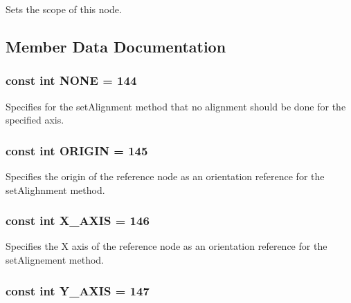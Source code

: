 Sets the scope of this node. 

\subsection{Member Data Documentation}
\hypertarget{classm3g_1_1Node_7b20f1b443e093d5ec5e990e73b47232}{
\subsubsection[{NONE}]{\setlength{\rightskip}{0pt plus 5cm}const int {\bf NONE} = 144}}
\label{classm3g_1_1Node_7b20f1b443e093d5ec5e990e73b47232}


Specifies for the setAlignment method that no alignment should be done for the specified axis. \hypertarget{classm3g_1_1Node_1b0d56eb173868ff472a6fd296c5bb6c}{
\subsubsection[{ORIGIN}]{\setlength{\rightskip}{0pt plus 5cm}const int {\bf ORIGIN} = 145}}
\label{classm3g_1_1Node_1b0d56eb173868ff472a6fd296c5bb6c}


Specifies the origin of the reference node as an orientation reference for the setAlighnment method. \hypertarget{classm3g_1_1Node_dd4bccb7b9c652e726d58b06bd28dab2}{
\subsubsection[{X\_\-AXIS}]{\setlength{\rightskip}{0pt plus 5cm}const int {\bf X\_\-AXIS} = 146}}
\label{classm3g_1_1Node_dd4bccb7b9c652e726d58b06bd28dab2}


Specifies the X axis of the reference node as an orientation reference for the setAlignement method. \hypertarget{classm3g_1_1Node_3248ff73b5411ab0a66a38c451c8b6fe}{
\subsubsection[{Y\_\-AXIS}]{\setlength{\rightskip}{0pt plus 5cm}const int {\bf Y\_\-AXIS} = 147}}
\label{classm3g_1_1Node_3248ff73b5411ab0a66a38c451c8b6fe}


